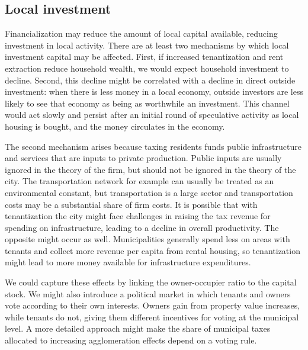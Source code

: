 \subsection{Local investment}
Financialization may reduce the amount of local capital available, reducing investment in local activity. %
There are at least two mechanisms by which local investment capital may be affected. First, if increased tenantization and rent extraction reduce household wealth, we would expect household investment to decline. Second, this decline might be correlated with a decline in direct outside investment: when there is less money in a local economy, outside investors are less likely to see that economy as being as worthwhile an investment. This channel would act slowly and persist after an initial round of speculative activity as local housing is bought, and the money circulates in the economy. %

The second mechanism arises because taxing residents funds public infrastructure and services that are inputs to private production. Public inputs are usually ignored in the theory of the firm, but should not be ignored in the theory of the city.  The transportation network for example can usually be treated as an environmental constant, but transportation is a large sector and transportation costs may be a substantial share of firm costs. It is possible that with tenantization the city might face challenges in raising the tax revenue for spending on infrastructure, leading to a decline in overall productivity. The opposite might occur as well. Municipalities generally spend less on areas with tenants and collect more revenue per capita from rental housing, so tenantization might lead to more money available for %
infrastructure expenditures. 

We could capture these effects by linking the owner-occupier ratio to the capital stock. We might also introduce a political market in which tenants and owners vote according to their own interests. Owners gain from property value increases, while tenants do not, giving them different incentives for voting at the municipal level. A more detailed approach might make the share of municipal taxes allocated to increasing agglomeration effects depend on a voting rule.


